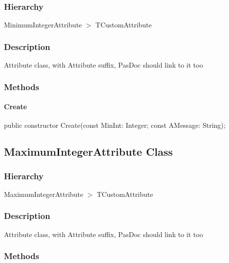 \documentclass{report}
\begin{document}
\subsubsection*{\large{\textbf{Hierarchy}}\normalsize\hspace{1ex}\hfill}
MinimumIntegerAttribute {$>$} TCustomAttribute
\subsubsection*{\large{\textbf{Description}}\normalsize\hspace{1ex}\hfill}
Attribute class, with Attribute suffix, PasDoc should link to it too\subsubsection*{\large{\textbf{Methods}}\normalsize\hspace{1ex}\hfill}
\paragraph*{Create}\hspace*{\fill}

\begin{list}{}{
\setlength{\itemindent}{0cm}
\setlength{\listparindent}{0cm}
\setlength{\leftmargin}{\evensidemargin}
\addtolength{\leftmargin}{\tmplength}
\settowidth{\labelsep}{X}
\addtolength{\leftmargin}{\labelsep}
\setlength{\labelwidth}{\tmplength}
}
\begin{flushleft}
\item[\textbf{Declaration}\hfill]
\begin{ttfamily}
public constructor Create(const MinInt: Integer; const AMessage: String);\end{ttfamily}


\end{flushleft}
\end{list}
\subsection*{MaximumIntegerAttribute Class}
\subsubsection*{\large{\textbf{Hierarchy}}\normalsize\hspace{1ex}\hfill}
MaximumIntegerAttribute {$>$} TCustomAttribute
\subsubsection*{\large{\textbf{Description}}\normalsize\hspace{1ex}\hfill}
Attribute class, with Attribute suffix, PasDoc should link to it too\subsubsection*{\large{\textbf{Methods}}\normalsize\hspace{1ex}\hfill}
\end{document}
